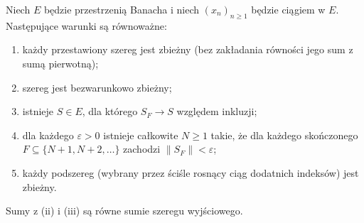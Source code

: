 \begin{twierdzenie}
\label{ma2:thm:unconditional-finite}
Niech $E$ będzie przestrzenią Banacha i niech $(x_n)_{n\ge1}$
będzie ciągiem w $E$. Następujące warunki są równoważne:
\begin{enumerate}[label=(\roman*)]
\item każdy przestawiony szereg jest zbieżny (bez
zakładania równości jego sum z sumą pierwotną);
\item szereg jest bezwarunkowo zbieżny;
\item istnieje $S\in E$, dla którego $S_F\to S$
względem inkluzji;
\item dla każdego $\varepsilon>0$ istnieje całkowite
$N\ge1$ takie, że dla każdego skończonego
$F\subseteq\{N+1,N+2,\ldots\}$ zachodzi
$\|S_F\|<\varepsilon$;
\item każdy podszereg (wybrany przez ściśle rosnący
ciąg dodatnich indeksów) jest zbieżny.
\end{enumerate}
Sumy z (ii) i (iii) są równe sumie szeregu wyjściowego.
\end{twierdzenie}
